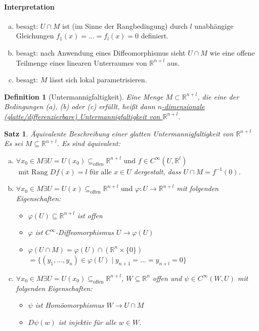 \documentclass[a4paper,11pt,notitlepage]{report}
\newtheorem{definition}{Definition}[chapter]
\newtheorem{theorem}{Satz}[chapter]
\newcommand{\R}{{\ensuremath{\mathbb{R}}}}
\begin{document}
\paragraph{Interpretation}
\begin{enumerate}[(a)]
	\item besagt: $U \cap M$ ist (im Sinne der Rangbedingung) durch $l$ unabhängige Gleichungen $f_1(x) = \ldots = f_l(x) = 0$ definiert.
	\item besagt: nach Anwendung eines Diffeomorphismus sieht $U \cap M$ wie eine offene Teilmenge eines linearen Unterraumes von $\R^{n+l}$ aus.
	\item besagt: $M$ lässt sich lokal parametrisieren.
\end{enumerate}

\begin{definition}[Untermannigfaltigkeit]
Eine Menge $M \subset \R^{n+l}$, die eine der Bedingungen (a), (b) oder (c) erfüllt, heißt dann \underline{$n$-dimensionale} \underline{(glatte/differenzierbare) Untermannigfaltigkeit von $\R^{n+l}$}.
\end{definition}


\begin{theorem}{Äquivalente Beschreibung einer glatten Untermannigfaltigkeit von $\R^{n+l}$}
	Es sei $M \subseteq \R^{n+l}$. Es sind äquivalent:
	\begin{enumerate}[(a)]
		\item $\forall x_0 \in M \exists U = U(x_0) \subseteq_{\text{offen}} \R^{n+l} \text{ und } f \in C^\infty(U,\R^l)$ $\text{ mit Rang }Df(x) = l \text{ für alle } x \in U$ dergestalt, dass $U \cap M = f^{-1}(0)$.
		\item $\forall x_0 \in M \exists U = U(x) \subseteq_{\text{offen}} \R^{n+l} \text{ und } \varphi \colon U \rightarrow \R^{n+l}$ mit folgenden Eigenschaften:
			\begin{itemize}
				\item $\varphi(U) \subseteq \R^{n+l}$ ist offen
				\item $\varphi$ ist $C^\infty$-Diffeomorphismus $U \rightarrow \varphi(U)$
				\item $\varphi(U \cap M) = \varphi(U) \cap (\R^n \times \{0\})$ $= \{(y_1, \ldots, y_n) \in \varphi(U) \mid y_{n+1} = \ldots = y_{n+l} = 0\}$
			\end{itemize}
		\item $\forall x_0 \in M \exists U = U(x_0) \subseteq_{\text{offen}} \R^{n+l}$, $W \subseteq \R^n$ offen und $\psi \in C^\infty(W,U)$ mit folgenden Eigenschaften:
			\begin{itemize}
				\item $\psi$ ist Homöomorphismus $W \rightarrow U \cap M$
				\item $D\psi(w)$ ist injektiv für alle $w \in W$.
			\end{itemize}
	\end{enumerate}
\end{theorem}
\end{document}
